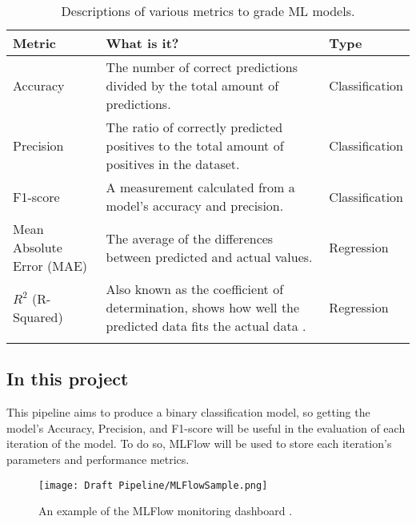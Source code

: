 \begin{longtable}{ |p{}| p{}| p{}|}
    \hline
    \cellcolor{blue!25}Metric & \cellcolor{blue!25}What is it? & \cellcolor{blue!25}Type\\
    \hline
    Accuracy & The number of correct predictions divided by the total amount of predictions. & Classification\\
    \hline
    Precision & The ratio of correctly predicted positives to the total amount of positives in the dataset. 
    & Classification \\
    \hline
    F1-score & A measurement calculated from a model's accuracy and precision.\autocite{kundu_f1_nodate} & Classification\\
    \hline
    Mean Absolute Error (MAE) & The average of the differences between predicted and actual values. & Regression\\
    \hline
    $R^2$ (R-Squared) & Also known as the coefficient of determination, shows how well the predicted data fits the 
    actual data \autocite{cfi_r-squared_nodate}. & Regression \\
    \hline
\caption{Descriptions of various metrics to grade ML models.}\label{tab:metrics}
\end{longtable}


\subsection{In this project}
This pipeline aims to produce a binary classification model, so getting the model's Accuracy, Precision, and F1-score will 
be useful in the evaluation of each iteration of the model. To do so, MLFlow will be used to store each iteration's 
parameters and performance metrics. 

\begin{figure}[H]
    \centering
    \texttt{[image: Draft Pipeline/MLFlowSample.png]}
    \caption{An example of the MLFlow monitoring dashboard \autocite{mlflow_mlflow_nodate}.}
    \label{fig:MLFlowSample}
\end{figure}
